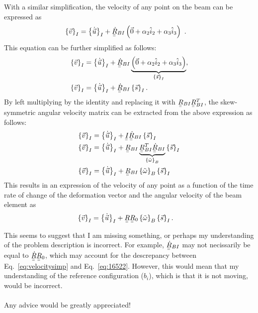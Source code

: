 \documentclass[a4paper]{article}
\newcommand{\ubar}[1]{\underaccent{\bar}{#1}}
\begin{document}
With a similar simplification, the velocity of any point on the beam can be expressed as  
\begin{align}
  \left\{ \vec{v} \right\}_{I} 
  &= \left\{ \dot{ \vec{u}}\right\}_{I} 
  + \ubar{\ubar{\dot{R}}}_{BI} 
  \left( \vec{0} + \alpha_{2} \hat{i}_{2} + \alpha_{3} \hat{i}_{3} \right) \ .
  \label{eq:velocity}
\end{align}
This equation can be further simplified as follows: 
\begin{align}
  \left\{ \vec{v} \right\}_{I} 
  &= \left\{ \dot{ \vec{u}}\right\}_{I} 
  + \ubar{\ubar{\dot{R}}}_{BI} 
  \underbrace{\left( \vec{0} + \alpha_{2} \hat{i}_{2} 
  + \alpha_{3} \hat{i}_{3} \right)}_{\left\{ \vec{s} \right\}_{I}}, \\
  \left\{ \vec{v} \right\}_{I} 
  &=  \left\{ \dot{ \vec{u}}\right\}_{I}
  + \ubar{\ubar{\dot{R}}}_{BI} \left\{ \vec{s} \right\}_{I}.
\end{align}
By left multiplying by the identity and replacing it with $\ubar{\ubar{R}}_{BI}\ubar{\ubar{R}}_{BI}^{T}$, the skew-symmetric angular velocity matrix can be extracted from the above expression as follows:
\begin{align}
  \left\{ \vec{v} \right\}_{I} 
  &=  \left\{ \dot{ \vec{u}}\right\}_{I}
  + \ubar{\ubar{I}} \ubar{\ubar{\dot{R}}}_{BI} \left\{ \vec{s} \right\}_{I}  \\
  \left\{ \vec{v} \right\}_{I} 
  &=  \left\{ \dot{ \vec{u}}\right\}_{I}
  + \ubar{\ubar{R}}_{BI} \underbrace{\ubar{\ubar{R}}^{T}_{BI} \ubar{\ubar{\dot{R}}}_{BI}}_{\left\{ \tilde{\omega} \right\}_{B}} \left\{ \vec{s} \right\}_{I}  \\
  \left\{ \vec{v} \right\}_{I} 
  &= \left\{ \dot{ \vec{u}}\right\}_{I}
  + \ubar{\ubar{R}}_{BI} \left\{ \tilde{\omega} \right\}_{B} \left\{ \vec{s} \right\}_{I}   
\end{align}
This results in an expression of the velocity of any point as a function of the time rate of change of the deformation vector and the angular velocity of the beam element as   
\begin{align}
  \left\{ \vec{v} \right\}_{I}
  &= \left\{ \dot{ \vec{u}}\right\}_{I}
  + \ubar{\ubar{R}} \ubar{\ubar{R}}_{0} \left\{ \tilde{\omega} \right\}_{B} \left\{ \vec{s} \right\}_{I}.
  \label{eq:velocitysimp2}
\end{align}

This seems to suggest that I am missing something, or perhaps my understanding of the problem description is incorrect.  For example, $\ubar{\ubar{\dot{R}}}_{BI}$ may not necissarily be equal to $\ubar{\ubar{\dot{R}}} \ubar{\ubar{R}}_{0}$, which may account for the descrepancy between Eq.~\eqref{eq:velocitysimp} and Eq.~\eqref{eq:16522}.  However, this would mean that my understanding of the reference configuration ($b_{i}$), which is that it is not moving, would be incorrect. \\ 
\\
Any advice would be greatly appreciated!  
\end{document}
